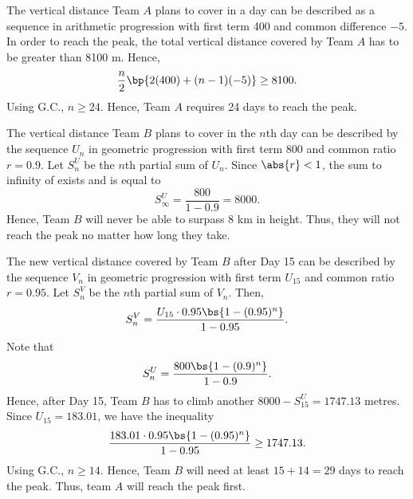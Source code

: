 \begin{solution}
    \begin{ppart}
        The vertical distance Team $A$ plans to cover in a day can be described as a sequence in arithmetic progression with first term 400 and common difference $-5$. In order to reach the peak, the total vertical distance covered by Team $A$ has to be greater than 8100 m. Hence, \[\frac{n}2 \bp{2 (400) + (n-1)(-5)} \geq 8100.\] Using G.C., $n \geq 24$. Hence, Team $A$ requires 24 days to reach the peak.
    \end{ppart}
    \begin{ppart}
        The vertical distance Team $B$ plans to cover in the $n$th day can be described by the sequence $U_n$ in geometric progression with first term 800 and common ratio $r = 0.9$. Let $S^U_n$ be the $n$th partial sum of $U_n$. Since $\abs{r} < 1$, the sum to infinity of exists and is equal to \[S^U_\infty = \frac{800}{1 - 0.9} = 8000.\] Hence, Team $B$ will never be able to surpass 8 km in height. Thus, they will not reach the peak no matter how long they take.
    \end{ppart}
    \begin{ppart}
        The new vertical distance covered by Team $B$ after Day 15 can be described by the sequence $V_n$ in geometric progression with first term $U_{15}$ and common ratio $r = 0.95$. Let $S^V_n$ be the $n$th partial sum of $V_n$. Then, \[S^V_n = \frac{U_{15}\cdot 0.95 \bs{1 - (0.95)^n}}{1 - 0.95}.\] Note that \[S^U_n = \frac{800\bs{1 - (0.9)^n}}{1 - 0.9}.\] Hence, after Day 15, Team $B$ has to climb another $8000 - S^U_{15} = 1747.13$ metres. Since $U_{15} = 183.01$, we have the inequality \[\frac{183.01\cdot0.95\bs{1 - (0.95)^n}}{1 - 0.95} \geq 1747.13.\] Using G.C., $n \geq 14$. Hence, Team $B$ will need at least $15 + 14 = 29$ days to reach the peak. Thus, team $A$ will reach the peak first.
    \end{ppart}
\end{solution}

